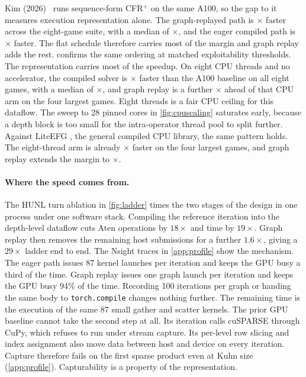 Kim (2026)~\cite{kim2026parallelizing} runs sequence-form CFR$^{+}$ on the same
A100, so the gap to it measures execution representation alone. The graph-replayed path is \kimGraphRange$\times$
faster across the eight-game suite, with a median of \kimGraphMedian$\times$, and the
eager compiled path is \kimEagerRange$\times$ faster. The flat schedule therefore carries most of the margin and graph replay adds the
rest.  confirms the same ordering at matched exploitability
thresholds. The representation carries most of the
speedup. On eight CPU threads and no accelerator, the compiled
solver is \kimCpuRange$\times$ faster than the A100 baseline on all eight games, with
a median of \kimCpuMedian$\times$, and graph replay is a further
\graphCpuLargestRange$\times$ ahead of that CPU arm on the four largest games. Eight threads is a fair CPU ceiling for this dataflow. The sweep to 28 pinned cores
in \cref{fig:cpuscaling} saturates early, because a depth block is too small for the
intra-operator thread pool to split further. Against LiteEFG \cite{liu2024liteefg},
the general compiled CPU library, the same pattern holds. The eight-thread arm is already \cpuLiteLargestRange$\times$ faster on the four
largest games, and graph replay extends the margin to \liteGraphLargestRange$\times$.

\paragraph{Where the speed comes from.}
\label{sec:ladder}

The HUNL turn ablation in \cref{fig:ladder} times the two stages of the design in one
process under one software stack. Compiling the reference iteration into the
depth-level dataflow cuts Aten operations by $18\times$ and time by $19\times$. Graph
replay then removes the remaining host submissions for a further $1.6\times$, giving a
$29\times$ ladder end to end. The Nsight traces in \cref{app:profile} show the
mechanism. The eager path issues 87 kernel launches per iteration and keeps the GPU
busy a third of the time. Graph replay issues one graph launch per iteration and keeps
the GPU busy 94\% of the time. Recording 100 iterations per graph or handing the same body to
\texttt{torch.compile} \cite{paszke2019pytorch} changes nothing further. The
remaining time is the execution of the same 87 small gather and scatter kernels. The prior GPU baseline \cite{kim2026parallelizing} cannot take the second step at
all. Its iteration calls cuSPARSE through CuPy, which refuses to run under stream
capture. Its per-level row slicing and index assignment also move data between host
and device on every iteration. Capture therefore fails on the first sparse product
even at Kuhn size (\cref{app:profile}). Capturability is a property of the representation.

